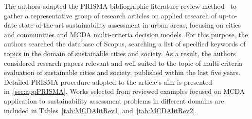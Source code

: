 \documentclass[final,5p,times,twocolumn,authoryear]{elsarticle}
\newcounter{example}[section]
\begin{document}
The authors adapted the PRISMA bibliographic literature review method~\citep{page2021prisma} to gather a representative group of research articles on applied research of up-to-date state-of-the-art sustainability assessment in urban areas, focusing on cities and communities and MCDA multi-criteria decision models. For this purpose, the authors searched the database of Scopus, searching a list of specified keywords of topics in the domain of sustainable cities and society. As a result, the authors considered research papers relevant and well suited to the topic of multi-criteria evaluation of sustainable cities and society, published within the last five years. Detailed PRISMA procedure adopted to the article's aim is presented in~\ref{sec:appPRISMA}. Works selected from reviewed examples focused on MCDA application to sustainability assessment problems in different domains are included in Tables~\ref{tab:MCDAlitRev1} and~\ref{tab:MCDAlitRev2}.
%
\end{document}
